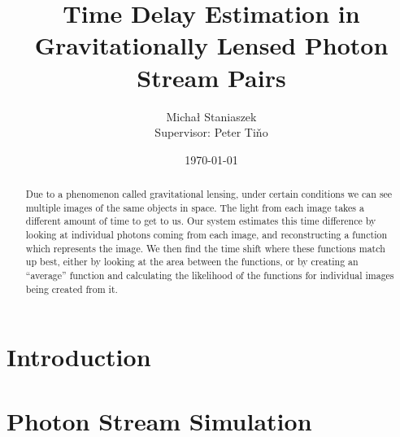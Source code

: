 \documentclass[a4paper,11pt]{article}
\title{Time Delay Estimation in Gravitationally Lensed Photon Stream Pairs}
\author{\Large{Micha{\l} Staniaszek} \\\small{Supervisor: Peter Ti{\v{n}}o}}
\date{\today}
\begin{document}
\maketitle



\begin{abstract}
  Due to a phenomenon called gravitational lensing, under certain conditions we
  can see multiple images of the same objects in space. The light from each
  image takes a different amount of time to get to us. Our system estimates this
  time difference by looking at individual photons coming from each image, and
  reconstructing a function which represents the image. We then find the time
  shift where these functions match up best, either by looking at the area
  between the functions, or by creating an ``average'' function and calculating
  the likelihood of the functions for individual images being created from it.
\end{abstract}

\section{Introduction}
\label{sec-1}
\section{Photon Stream Simulation}
\label{sec-2}
\end{document}
